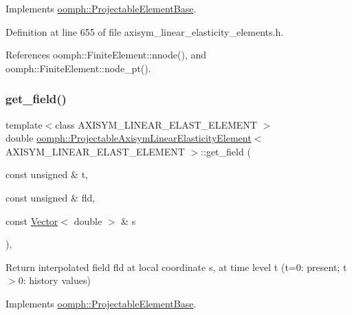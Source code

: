 Implements \hyperlink{classoomph_1_1ProjectableElementBase_a644306ebdf16f334344c2d27d72f18b7}{oomph\+::\+Projectable\+Element\+Base}.



Definition at line 655 of file axisym\+\_\+linear\+\_\+elasticity\+\_\+elements.\+h.



References oomph\+::\+Finite\+Element\+::nnode(), and oomph\+::\+Finite\+Element\+::node\+\_\+pt().

\mbox{\label{classoomph_1_1ProjectableAxisymLinearElasticityElement_a125b64cda7cc665d987660bccedd3c39}} 
\subsubsection{\texorpdfstring{get\+\_\+field()}{get\_field()}}
{\footnotesize\ttfamily template$<$class A\+X\+I\+S\+Y\+M\+\_\+\+L\+I\+N\+E\+A\+R\+\_\+\+E\+L\+A\+S\+T\+\_\+\+E\+L\+E\+M\+E\+NT $>$ \\
double \hyperlink{classoomph_1_1ProjectableAxisymLinearElasticityElement}{oomph\+::\+Projectable\+Axisym\+Linear\+Elasticity\+Element}$<$ A\+X\+I\+S\+Y\+M\+\_\+\+L\+I\+N\+E\+A\+R\+\_\+\+E\+L\+A\+S\+T\+\_\+\+E\+L\+E\+M\+E\+NT $>$\+::get\+\_\+field (\begin{DoxyParamCaption}\item[{const unsigned \&}]{t,  }\item[{const unsigned \&}]{fld,  }\item[{const \hyperlink{classoomph_1_1Vector}{Vector}$<$ double $>$ \&}]{s }\end{DoxyParamCaption})\hspace{0.3cm}{\ttfamily [inline]}, {\ttfamily [virtual]}}



Return interpolated field fld at local coordinate s, at time level t (t=0\+: present; t$>$0\+: history values) 



Implements \hyperlink{classoomph_1_1ProjectableElementBase_ae4da5b565b6d333be2f5920f7be763cd}{oomph\+::\+Projectable\+Element\+Base}.



